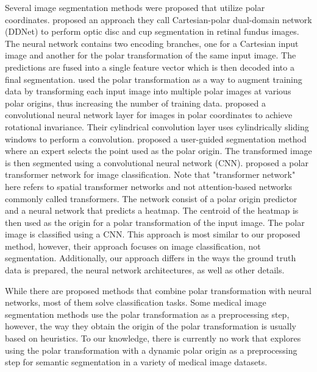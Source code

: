 Several image segmentation methods were proposed that utilize polar coordinates. 
\citet{liuDDNetCartesianpolarDualdomain2019a} proposed an approach they
call Cartesian-polar dual-domain network (DDNet) to perform optic disc and cup segmentation
in retinal fundus images. The neural network contains two encoding branches, one for a Cartesian input image and another for the polar transformation of the same input image. The predictions are fused into a single feature vector which is then decoded into a final segmentation.
\citet{salehinejadImageAugmentationUsing2018} used the polar transformation as a way to 
augment
training data by transforming each input image into multiple polar images at various polar
origins, thus increasing the number of training data.
\citet{kimCyCNNRotationInvariant2020a} proposed a convolutional neural network layer for 
images in polar 
coordinates to achieve rotational invariance. Their cylindrical convolution layer uses cylindrically sliding windows to perform a convolution.
\citet{kimCNNBasedUGS2018} proposed a user-guided segmentation method where an expert 
selects the
point used as the polar origin. The transformed image is then
segmented using a convolutional neural network (CNN). 
\citet{estevesPolarTransformerNetworks2018a} proposed a polar transformer network for image 
classification. Note that "transformer network" here refers to spatial transformer networks 
\cite{jaderbergSpatialTransformerNetworks2016} and not attention-based networks commonly called 
transformers.
The network 
consist of a polar origin predictor and a neural network that predicts a heatmap. The centroid of the heatmap is then used as the origin for a polar transformation of the input image. The polar image is classified using a CNN. This approach is most similar to our proposed method, 
however, their approach focuses on image classification, not segmentation. Additionally, our approach differs in the ways the ground truth data is prepared, the neural network architectures, as well as other details.

While there are proposed methods that combine polar transformation with neural networks, most of them solve classification tasks. Some medical image segmentation methods use the polar transformation as a preprocessing step, however, the way they obtain the origin of the polar transformation is usually based on heuristics. To our knowledge, there is currently no work that explores using the polar transformation with a dynamic polar origin as a preprocessing step for semantic segmentation in a variety of medical image datasets.

